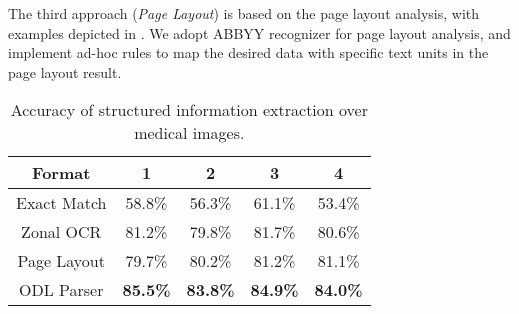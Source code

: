 The third approach (\textit{Page Layout}) is based on the page layout analysis,
with examples depicted in .
We adopt ABBYY recognizer for page layout analysis,
and implement ad-hoc rules to map the desired data with specific text units
in the page layout result.



\begin{table}[!hbp]
\centering
\caption{Accuracy of structured information extraction over medical images.}
\label{tab:compare}
\begin{tabular}{|c|c|c|c|c|}
\hline
Format & 1 & 2 & 3 & 4\\
\hline \hline
Exact Match & 58.8\% & 56.3\% & 61.1\% & 53.4\% \\
\hline
Zonal OCR & 81.2\% & 79.8\% & 81.7\% & 80.6\% \\
\hline
Page Layout & 79.7\% & 80.2\% & 81.2\% & 81.1\% \\
\hline
ODL Parser & {\bf 85.5\%} & {\bf 83.8\%} & {\bf 84.9\%} & {\bf 84.0\%}\\
\hline
\end{tabular}
\end{table}



